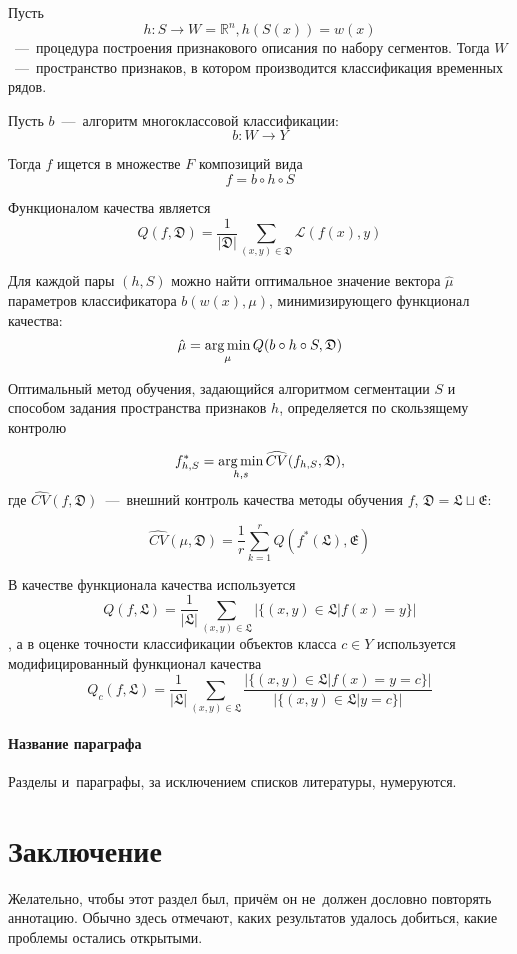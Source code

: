 \documentclass[12pt, twoside]{article}
\begin{document}
Пусть $$h:S\rightarrow W = \mathds{R}^n, h(S(x))=w(x)$$~---~процедура построения признакового описания по набору сегментов. Тогда $W$~---~пространство признаков, в котором производится классификация временных рядов.

Пусть $b$~---~алгоритм многоклассовой классификации: $$b:W\rightarrow Y$$

Тогда $f$ ищется в множестве $F$ композиций вида $$f=b\circ h\circ S$$

Функционалом качества является $$Q(f,\mathfrak{D})=\frac{1}{|\mathfrak{D}|}\sum\limits_{(x,y)\in\mathfrak{D}}\mathscr{L}(f(x),y)$$

Для каждой пары $(h,S)$ можно найти оптимальное значение вектора $\hat\mu$ параметров классификатора $b(w(x),\mu)$, минимизирующего функционал качества: $$\hat\mu=\argmin_\mu Q(b\circ h\circ S,\mathfrak{D})$$

Оптимальный метод обучения, задающийся алгоритмом сегментации $S$ и способом задания пространства признаков $h$, определяется по скользящему контролю

$$f_{h,S}^*=\argmin\limits_{h,s}\widehat{CV}(f_{h,S},\mathfrak{D}),$$ где $\widehat{CV}(f,\mathfrak{D})$~---~внешний контроль качества методы обучения $f$, $\mathfrak{D}=\mathfrak{L}\sqcup\mathfrak{E}$:
 
$$\widehat{CV}(\mu, \mathfrak{D})=\frac{1}{r}\sum\limits_{k=1}^r Q(f^*(\mathfrak{L}),\mathfrak{E})$$

В качестве функционала качества используется $$Q(f,\mathfrak{L})=\frac{1}{|\mathfrak{L}|}\sum\limits_{(x,y)\in\mathfrak{L}}|\{(x,y)\in\mathfrak{L}|f(x)=y\}|$$, а в оценке точности классификации объектов класса $c\in Y$ используется модифицированный функционал качества $$Q_c(f,\mathfrak{L})=\frac{1}{|\mathfrak{L}|}\sum\limits_{(x,y)\in\mathfrak{L}}\frac{|\{(x,y)\in\mathfrak{L}|f(x)=y=c\}|}{|\{(x,y)\in\mathfrak{L}|y=c\}|}$$





\paragraph{Название параграфа}
Разделы и~параграфы, за исключением списков литературы, нумеруются.

\section{Заключение}
Желательно, чтобы этот раздел был, причём он не~должен дословно повторять аннотацию.
Обычно здесь отмечают, каких результатов удалось добиться, какие проблемы остались открытыми.
\end{document}
